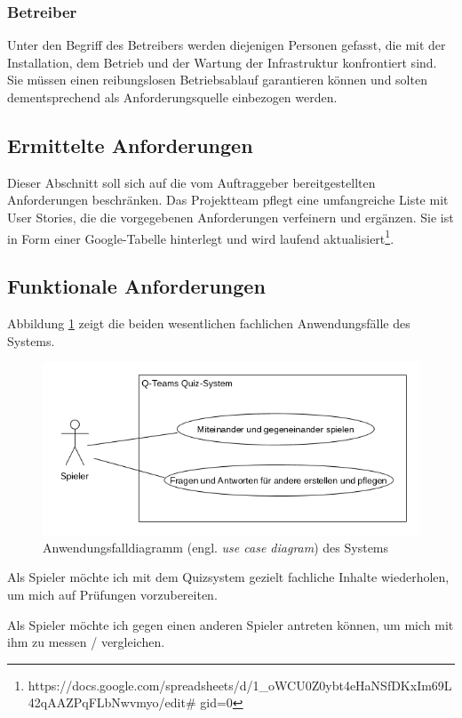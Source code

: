 \documentclass[a4paper,11pt,listof=numbered,glossary=totoc,parskip=half,toc=bib]{scrreprt}
\begin{document}
\subsubsection{Betreiber}

Unter den Begriff des Betreibers werden diejenigen Personen gefasst, die mit der Installation, dem Betrieb und der Wartung der Infrastruktur konfrontiert sind.
Sie müssen einen reibungslosen Betriebsablauf garantieren können und solten dementsprechend als Anforderungsquelle einbezogen werden.

\subsection{Ermittelte Anforderungen }

Dieser Abschnitt soll sich auf die vom Auftraggeber bereitgestellten Anforderungen beschränken. Das Projektteam pflegt eine umfangreiche Liste mit User Stories, die die vorgegebenen Anforderungen verfeinern und ergänzen. Sie ist in Form einer Google-Tabelle hinterlegt und wird laufend aktualisiert\footnote{https://docs.google.com/spreadsheets/d/1\_{}oWCU0Z0ybt4eHaNSfDKxIm69L42qAAZPqFLbNwvmyo/edit\# gid=0}.

\subsection{Funktionale Anforderungen}

Abbildung \ref{fig:ucd} zeigt die beiden wesentlichen fachlichen Anwendungsfälle des Systems.

\begin{figure}
	\centering
	\includegraphics[width=0.8\linewidth]{ucd.png}
	\caption{Anwendungsfalldiagramm (engl. \textit{use case diagram}) des Systems}
	\label{fig:ucd}
\end{figure}

Als Spieler möchte ich mit dem Quizsystem gezielt fachliche Inhalte wiederholen, um mich auf Prüfungen vorzubereiten.

Als Spieler möchte ich gegen einen anderen Spieler antreten können, um mich mit ihm zu messen / vergleichen.
\end{document}
